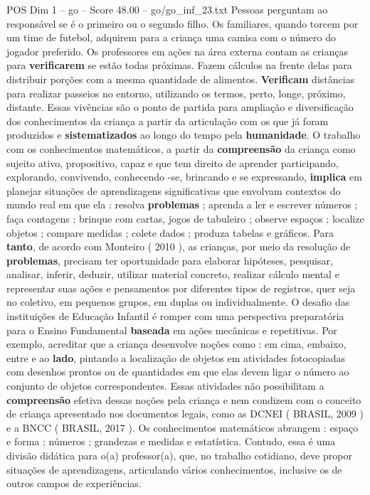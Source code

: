 \begin{textsample}{POS Dim 1 – go – Score 48.00 – go/go\_inf\_23.txt}
Pessoas perguntam ao responsável se é o primeiro ou o segundo filho.
Os familiares, quando torcem por um time de futebol, adquirem para a criança uma camisa com o número do jogador preferido.
Os professores em ações na área externa contam as crianças para \textbf{verificarem} se estão todas próximas.
Fazem cálculos na frente delas para distribuir porções com a mesma quantidade de alimentos. \textbf{Verificam} distâncias para realizar passeios no entorno, utilizando os termos, perto, longe, próximo, distante.
Essas vivências são o ponto de partida para ampliação e diversificação dos conhecimentos da criança a partir da articulação com os que já foram produzidos e \textbf{sistematizados} ao longo do tempo pela \textbf{humanidade}.
O trabalho com os conhecimentos matemáticos, a partir da \textbf{compreensão} da criança como sujeito ativo, propositivo, capaz e que tem direito de aprender participando, explorando, convivendo, conhecendo -se, brincando e se expressando, \textbf{implica} em planejar situações de aprendizagens significativas que envolvam contextos do mundo real em que ela : resolva \textbf{problemas} ; aprenda a ler e escrever números ; faça contagens ; brinque com cartas, jogos de tabuleiro ; observe espaços ; localize objetos ; compare medidas ; colete dados ; produza tabelas e gráficos.
Para \textbf{tanto}, de acordo com Monteiro ( 2010 ), as crianças, por meio da resolução de \textbf{problemas}, precisam ter oportunidade para elaborar hipóteses, pesquisar, analisar, inferir, deduzir, utilizar material concreto, realizar cálculo mental e representar suas ações e pensamentos por diferentes tipos de registros, quer seja no coletivo, em pequenos grupos, em duplas ou individualmente.
O desafio das instituições de Educação Infantil é romper com uma perspectiva preparatória para o Ensino Fundamental \textbf{baseada} em ações mecânicas e repetitivas.
Por exemplo, acreditar que a criança desenvolve noções como : em cima, embaixo, entre e ao \textbf{lado}, pintando a localização de objetos em atividades fotocopiadas com desenhos prontos ou de quantidades em que elas devem ligar o número ao conjunto de objetos correspondentes.
Essas atividades não possibilitam a \textbf{compreensão} efetiva dessas noções pela criança e nem condizem com o conceito de criança apresentado nos documentos legais, como as DCNEI ( BRASIL, 2009 ) e a BNCC ( BRASIL, 2017 ).
Os conhecimentos matemáticos abrangem : espaço e forma ; números ; grandezas e medidas e estatística.
Contudo, essa é uma divisão didática para o(a) professor(a), que, no trabalho cotidiano, deve propor situações de aprendizagens, articulando vários conhecimentos, inclusive os de outros campos de experiências.

\end{textsample}
